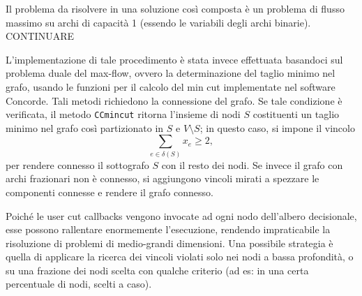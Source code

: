 Il problema da risolvere in una soluzione così composta è un problema di flusso massimo su archi di capacità 1 (essendo le variabili degli archi binarie). CONTINUARE

L'implementazione di tale procedimento è stata invece effettuata basandoci sul problema duale del max-flow, ovvero la determinazione del taglio minimo nel grafo, usando le funzioni per il calcolo del min cut implementate nel software Concorde. Tali metodi richiedono la connessione del grafo. Se tale condizione è verificata, il metodo \texttt{CCmincut} ritorna l'insieme di nodi $S$ costituenti un taglio minimo nel grafo così partizionato in $S$ e $V\setminus S$; in questo caso, si impone il vincolo
\begin{equation}
  \sum_{e \in \delta(S)}x_e \geq 2, \label{eqn:flowconst}
\end{equation}
per rendere connesso il sottografo $S$ con il resto dei nodi. Se invece il grafo con archi frazionari non è connesso, si aggiungono vincoli mirati a spezzare le componenti connesse e rendere il grafo connesso.

Poiché le user cut callbacks vengono invocate ad ogni nodo dell'albero decisionale, esse possono rallentare enormemente l'esecuzione, rendendo impraticabile la risoluzione di problemi di medio-grandi dimensioni. Una possibile strategia è quella di applicare la ricerca dei vincoli violati solo nei nodi a bassa profondità, o su una frazione dei nodi scelta con qualche criterio (ad es: in una certa percentuale di nodi, scelti a caso).

